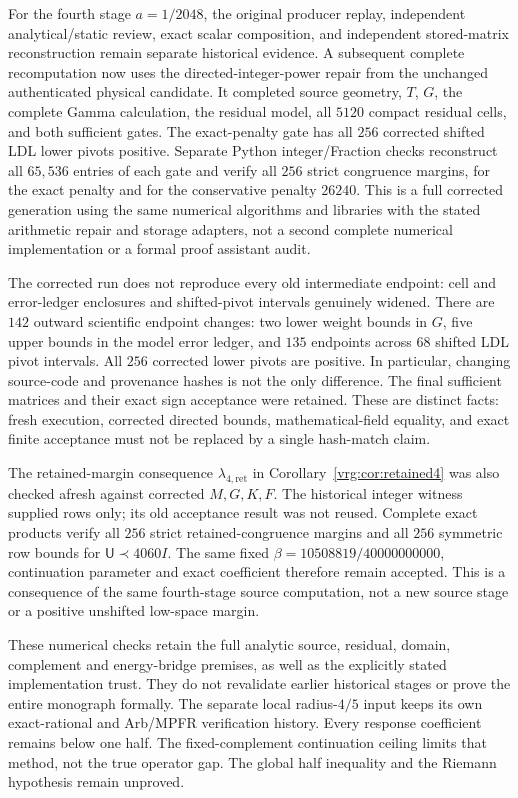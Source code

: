 \documentclass[11pt,a4paper]{article}
\numberwithin{equation}{section}
\theoremstyle{definition}\newtheorem{definition}[theorem]{Definition}
\theoremstyle{remark}\newtheorem{remark}[theorem]{Remark}
\begin{document}
For the fourth stage $a=1/2048$, the original producer replay, independent
analytical/static review, exact scalar composition, and independent
stored-matrix reconstruction remain separate historical evidence. A
subsequent complete recomputation now uses the directed-integer-power
repair from the unchanged authenticated physical candidate. It completed
source geometry, $T$, $G$, the complete Gamma calculation, the residual
model, all $5120$ compact residual cells, and both sufficient gates.
The exact-penalty gate has all $256$ corrected shifted LDL lower pivots
positive. Separate Python integer/Fraction checks reconstruct all
$65,536$ entries of each gate and verify all $256$ strict congruence
margins, for the exact penalty and for the conservative penalty $26240$.
This is a full corrected generation using the same numerical algorithms
and libraries with the stated arithmetic repair and storage adapters,
not a second complete numerical implementation or a formal proof assistant audit.

The corrected run does not reproduce every old intermediate endpoint:
cell and error-ledger enclosures and shifted-pivot intervals genuinely
widened. There are $142$ outward scientific endpoint changes: two lower
weight bounds in $G$, five upper bounds in the model error ledger, and
$135$ endpoints across $68$ shifted LDL pivot intervals. All $256$ corrected
lower pivots are positive. In particular, changing source-code and provenance hashes is
not the only difference. The final sufficient matrices and their exact
sign acceptance were retained. These are distinct facts: fresh execution,
corrected directed bounds, mathematical-field equality, and exact finite
acceptance must not be replaced by a single hash-match claim.

The retained-margin consequence $\lambda_{4,\mathrm{ret}}$ in
Corollary~\ref{vrg:cor:retained4} was also checked afresh against corrected
$M,G,K,F$. The historical integer witness supplied rows only; its old
acceptance result was not reused. Complete exact products verify all
$256$ strict retained-congruence margins and all $256$ symmetric row
bounds for $\mathsf U\prec4060I$. The same fixed
$\beta=10508819/40000000000$, continuation parameter and exact coefficient
therefore remain accepted. This is a consequence of the same fourth-stage
source computation, not a new source stage or a positive unshifted
low-space margin.

These numerical checks retain the full analytic source, residual, domain,
complement and energy-bridge premises, as well as the explicitly stated
implementation trust. They do not revalidate earlier historical stages
or prove the entire monograph formally. The separate local radius-$4/5$
input keeps its own exact-rational and Arb/MPFR verification history.
Every response coefficient remains below one half. The fixed-complement
continuation ceiling limits that method, not the true operator gap.
The global half inequality and the Riemann hypothesis remain unproved.
\end{document}
